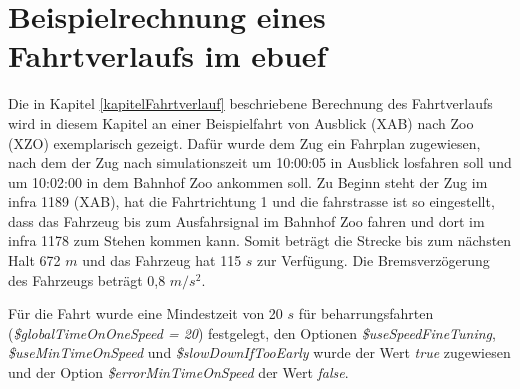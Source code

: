 \section{Beispielrechnung eines Fahrtverlaufs im \ac{ebuef}} \label{beispielrechnungKapitel}
Die in Kapitel \ref{kapitelFahrtverlauf} beschriebene Berechnung des Fahrtverlaufs wird in diesem Kapitel an einer Beispielfahrt von Ausblick (XAB) nach Zoo (XZO) exemplarisch gezeigt. Dafür wurde dem Zug ein Fahrplan zugewiesen, nach dem der Zug nach \Gls{simulationszeit} um 10:00:05 in Ausblick losfahren soll und um 10:02:00 in dem Bahnhof Zoo ankommen soll. Zu Beginn steht der Zug im \ac{infra} 1189 (XAB), hat die Fahrtrichtung 1 und die \Gls{fahrstrasse} ist so eingestellt, dass das Fahrzeug bis zum Ausfahrsignal im Bahnhof Zoo fahren und dort im \ac{infra} 1178 zum Stehen kommen kann. Somit beträgt die Strecke bis zum nächsten Halt 672 $m$ und das Fahrzeug hat 115 $s$ zur Verfügung. Die Bremsverzögerung des Fahrzeugs beträgt 0,8 $m/s^{2}$.

Für die Fahrt wurde eine Mindestzeit von 20 $s$ für \Gls{beharrungsfahrt}en (\textit{\$glo\-bal\-Time\-On\-One\-Speed = 20}) festgelegt, den Optionen \textit{\$useSpeedFineTuning}, \textit{\$use\-Min\-Time\-On\-Speed} und \textit{\$slowDownIfTooEarly} wurde der Wert \textit{true} zugewiesen und der Option \textit{\$errorMinTimeOnSpeed} der Wert \textit{false}.


